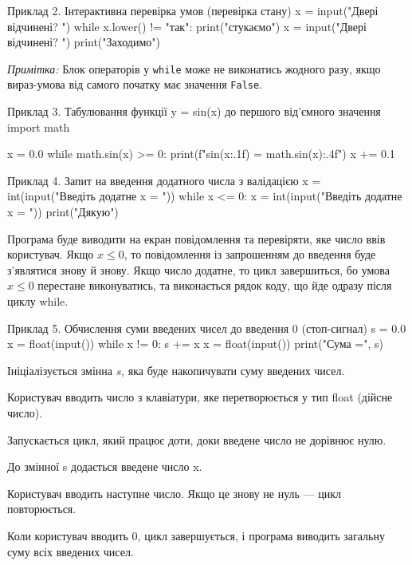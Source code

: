 \begin{py}{Приклад 2. Інтерактивна перевірка умов (перевірка стану)}
x = input("Двері відчинені? ")
while x.lower() != "так":
    print("стукаємо")
    x = input("Двері відчинені? ")
print("Заходимо")
\end{py}

\textit{Примітка:} Блок операторів у \texttt{while} може не виконатись жодного разу, якщо вираз-умова від самого початку має значення \texttt{False}.

\begin{py}{Приклад 3. Табулювання функції y = sin(x) до першого від'ємного значення}
import math

x = 0.0
while math.sin(x) >= 0:
    print(f"sin({x:.1f}) = {math.sin(x):.4f}")
    x += 0.1
\end{py}

\begin{py}{Приклад 4. Запит на введення додатного числа з валідацією}
x = int(input("Введіть додатне x = "))
while x <= 0:
    x = int(input("Введіть додатне x = "))
print("Дякую")
\end{py}
Програма буде виводити на екран повідомлення та перевіряти, яке число ввів користувач. Якщо $x \le 0$, то повідомлення із запрошенням до введення буде з'являтися знову й знову. Якщо число додатне, то цикл завершиться, бо умова $x \le 0$ перестане виконуватись, та виконається рядок коду, що йде одразу після циклу while. 

\begin{py}{Приклад 5. Обчислення суми введених чисел до введення 0 (стоп-сигнал)}
s = 0.0
x = float(input())
while x != 0:
    s += x
    x = float(input())
print("Сума =", s)
\end{py}

Ініціалізується змінна $s$, яка буде накопичувати суму введених чисел.

Користувач вводить число з клавіатури, яке перетворюється у тип float (дійсне число).

Запускається цикл, який працює доти, доки введене число не дорівнює нулю.

До змінної s додається введене число x.

Користувач вводить наступне число. Якщо це знову не нуль — цикл повторюється.

Коли користувач вводить 0, цикл завершується, і програма виводить загальну суму всіх введених чисел.

